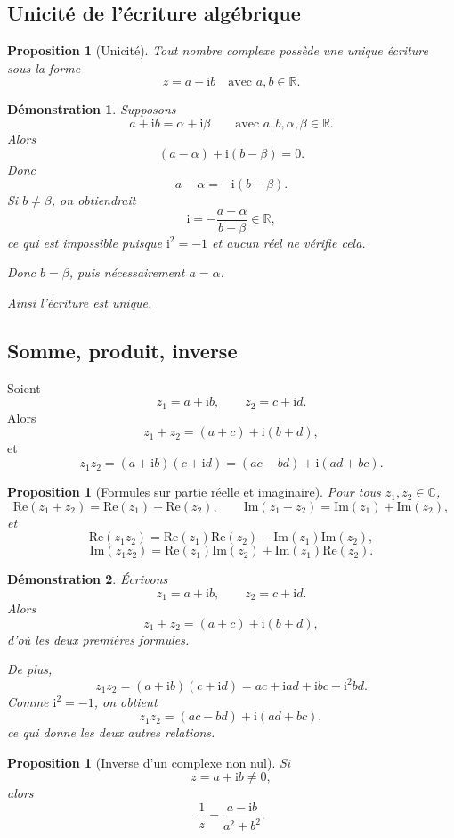\documentclass[11pt,a4paper]{article}
\newtheorem{proposition}[definition]{Proposition}
\newtheorem*{demonstration}{Démonstration}
\newcommand{\R}{\mathbb{R}}
\newcommand{\C}{\mathbb{C}}
\newcommand{\ii}{\mathrm{i}}
\newcommand{\Ree}{\mathrm{Re}}
\newcommand{\Imm}{\mathrm{Im}}
\begin{document}
\subsection{Unicité de l'écriture algébrique}

\begin{proposition}[Unicité]
Tout nombre complexe possède une unique écriture sous la forme
\[
z=a+\ii b
\quad \text{avec } a,b\in \R.
\]
\end{proposition}

\begin{demonstration}
Supposons
\[
a+\ii b=\alpha+\ii \beta
\qquad \text{avec } a,b,\alpha,\beta\in \R.
\]
Alors
\[
(a-\alpha)+\ii(b-\beta)=0.
\]
Donc
\[
a-\alpha=-\ii(b-\beta).
\]
Si $b\neq \beta$, on obtiendrait
\[
\ii=-\frac{a-\alpha}{b-\beta}\in \R,
\]
ce qui est impossible puisque $\ii^2=-1$ et aucun réel ne vérifie cela.

Donc $b=\beta$, puis nécessairement $a=\alpha$.

Ainsi l'écriture est unique.
\end{demonstration}

\subsection{Somme, produit, inverse}

Soient
\[
z_1=a+\ii b,\qquad z_2=c+\ii d.
\]
Alors
\[
z_1+z_2=(a+c)+\ii(b+d),
\]
et
\[
z_1z_2=(a+\ii b)(c+\ii d)=(ac-bd)+\ii(ad+bc).
\]

\begin{proposition}[Formules sur partie réelle et imaginaire]
Pour tous $z_1,z_2\in \C$,
\[
\Ree(z_1+z_2)=\Ree(z_1)+\Ree(z_2),\qquad
\Imm(z_1+z_2)=\Imm(z_1)+\Imm(z_2),
\]
et
\[
\Ree(z_1z_2)=\Ree(z_1)\Ree(z_2)-\Imm(z_1)\Imm(z_2),
\]
\[
\Imm(z_1z_2)=\Ree(z_1)\Imm(z_2)+\Imm(z_1)\Ree(z_2).
\]
\end{proposition}

\begin{demonstration}
Écrivons
\[
z_1=a+\ii b,\qquad z_2=c+\ii d.
\]
Alors
\[
z_1+z_2=(a+c)+\ii(b+d),
\]
d'où les deux premières formules.

De plus,
\[
z_1z_2=(a+\ii b)(c+\ii d)=ac+\ii ad+\ii bc+\ii^2bd.
\]
Comme $\ii^2=-1$, on obtient
\[
z_1z_2=(ac-bd)+\ii(ad+bc),
\]
ce qui donne les deux autres relations.
\end{demonstration}

\begin{proposition}[Inverse d'un complexe non nul]
Si
\[
z=a+\ii b\neq 0,
\]
alors
\[
\frac{1}{z}=\frac{a-\ii b}{a^2+b^2}.
\]
\end{proposition}
\end{document}
